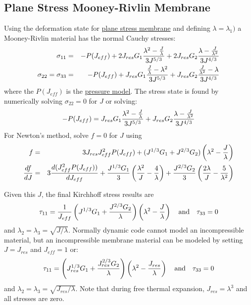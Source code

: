 \documentclass[11pt]{book}
\def\Jeff{J_{eff}}
\def\Jres{J_{res}}
\begin{document}
\subsection{Plane Stress Mooney-Rivlin Membrane}

Using the deformation state for \hyperref[MMT]{plane stress membrane} and defining $\lambda=\lambda_1)$ a Mooney-Rivlin material has the normal Cauchy stresses:
\begin{eqnarray}
      \sigma_{11} & = & -P(\Jeff) + 2\Jres G_1{\lambda^2-{J\over\lambda}\over 3J^{5/3}} + 2\Jres G_2{\lambda-{J\over\lambda^2}\over 3J^{4/3}} \\
      \sigma_{22} = \sigma_{33} & = & -P(\Jeff) +  \Jres G_1{{J\over\lambda}-\lambda^2\over 3J^{5/3}} + \Jres G_2{{J\over\lambda^2}-\lambda\over 3J^{4/3}}
\end{eqnarray}
where the $P(\Jeff)$ is the \hyperref[PTerms]{pressure model}. The stress state is found by numerically solving $\sigma_{22}=0$ for $J$ or solving:
\begin{equation}
	-P(\Jeff) =  \Jres G_1{\lambda^2-{J\over\lambda}\over 3J^{5/3}} + \Jres G_2{\lambda-{J\over\lambda^2}\over 3J^{4/3}}
\end{equation}
For Newton's method, solve $f=0$ for $J$ using
\begin{eqnarray}
	f & = & 3\Jres \Jeff^2 P(\Jeff) + (J^{1/3}G_1+J^{2/3}G_2)\left(\lambda^2-{J\over\lambda}\right) \\
	{df\over dJ} & = & 3 {d(\Jeff^2 P(\Jeff))\over d\Jeff} + {J^{1/3}G_1\over 3}\left({\lambda^2\over J}-{4\over\lambda}\right)
	+ {J^{2/3}G_2\over 3}\left({2\lambda\over J}-{5\over\lambda^2}\right)
\end{eqnarray}

Given this $J$, the final Kirchhoff stress results are
\begin{equation}
     \tau_{11} =  {1\over \Jeff}\left(J^{1/3}G_1 + {J^{2/3}G_2\over \lambda}\right)\left(\lambda^2-{J\over\lambda}\right) \quad{\rm and}\quad
     \tau_{33} = 0 
\end{equation}
and   $ \lambda_2 = \lambda_3 = \sqrt{J/\lambda}$.
Normally dynamic code cannot model an incompressible material, but an incompressible membrane material can be modeled by setting $J=\Jres$ and $\Jeff = 1$ or:
\begin{equation}
     \tau_{11} = \left(\Jres^{1/3}G_1 + {\Jres^{2/3}G_2\over \lambda}\right)\left(\lambda^2-{\Jres\over\lambda}\right) \quad{\rm and}\quad
     \tau_{33} = 0 
\end{equation}
and $ \lambda_2 = \lambda_3 = \sqrt{\Jres/\lambda}$.
Note that during free thermal expansion, $\Jres=\lambda^3$ and all stresses are zero.
\end{document}

